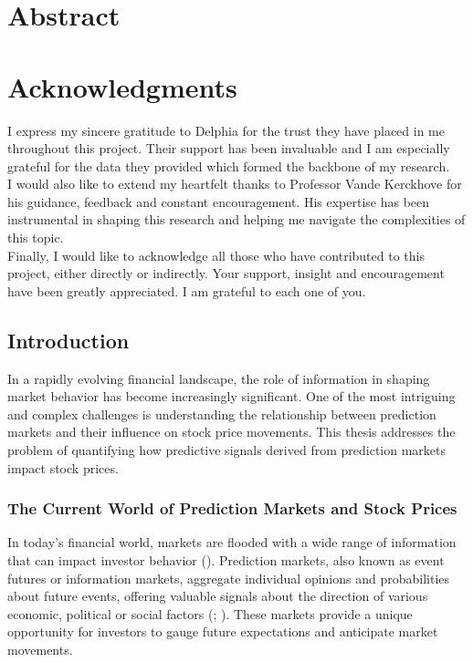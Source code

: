 \documentclass[12pt]{report}
\begin{document}



\chapter*{Abstract}


\chapter*{Acknowledgments}

I express my sincere gratitude to Delphia for the trust they have placed in me throughout this project. Their support has been invaluable and I am especially grateful for the data they provided which formed the backbone of my research.\\

I would also like to extend my heartfelt thanks to Professor Vande Kerckhove for his guidance, feedback and constant encouragement. His expertise has been instrumental in shaping this research and helping me navigate the complexities of this topic.\\

Finally, I would like to acknowledge all those who have contributed to this project, either directly or indirectly. Your support, insight and encouragement have been greatly appreciated. I am grateful to each one of you.\\



\tableofcontents

\newpage \section{Introduction}

In a rapidly evolving financial landscape, the role of information in shaping market behavior has become increasingly significant. One of the most intriguing and complex challenges is understanding the relationship between prediction markets and their influence on stock price movements. This thesis addresses the problem of quantifying how predictive signals derived from prediction markets impact stock prices.

\subsection{The Current World of Prediction Markets and Stock Prices}

In today’s financial world, markets are flooded with a wide range of information that can impact investor behavior (\cite{li_effect_2014}). Prediction markets, also known as event futures or information markets, aggregate individual opinions and probabilities about future events, offering valuable signals about the direction of various economic, political or social factors (\cite{waitz_corporate_2013}; \cite{wolfers_prediction_2004}). These markets provide a unique opportunity for investors to gauge future expectations and anticipate market movements.
\end{document}
